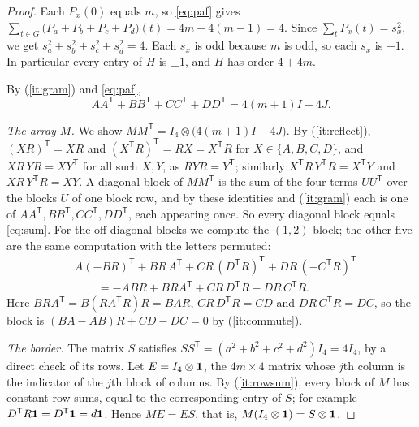 \documentclass[11pt,colorlinks]{charlie}
\newcommand{\T}{\mathsf T}
\begin{document}
\begin{proof}
Each $P_x(0)$ equals $m$, so \eqref{eq:paf} gives $\sum_{t\in G}\bigl(P_a+P_b+P_c+P_d\bigr)(t)=4m-4(m-1)=4$. Since $\sum_tP_x(t)=s_x^2$, we get $s_a^2+s_b^2+s_c^2+s_d^2=4$. Each $s_x$ is odd because $m$ is odd, so each $s_x$ is $\pm1$. In particular every entry of $H$ is $\pm1$, and $H$ has order $4+4m$.

By (\ref{it:gram}) and \eqref{eq:paf},
\begin{equation}\label{eq:sum}
AA^{\T}+BB^{\T}+CC^{\T}+DD^{\T}=4(m+1)I-4J.
\end{equation}

\emph{The array $M$.} We show $MM^{\T}=I_4\otimes\bigl(4(m+1)I-4J\bigr)$. By (\ref{it:reflect}), $(XR)^{\T}=XR$ and $(X^{\T}R)^{\T}=RX=X^{\T}R$ for $X\in\{A,B,C,D\}$, and $XR\,YR=XY^{\T}$ for all such $X,Y$, as $RYR=Y^{\T}$; similarly $X^{\T}R\,Y^{\T}R=X^{\T}Y$ and $XR\,Y^{\T}R=XY$. A diagonal block of $MM^{\T}$ is the sum of the four terms $UU^{\T}$ over the blocks $U$ of one block row, and by these identities and (\ref{it:gram}) each is one of $AA^{\T},BB^{\T},CC^{\T},DD^{\T}$, each appearing once. So every diagonal block equals \eqref{eq:sum}. For the off-diagonal blocks we compute the $(1,2)$ block; the other five are the same computation with the letters permuted:
\begin{align*}
&A(-BR)^{\T}+BR\,A^{\T}+CR\,(D^{\T}R)^{\T}+DR\,(-C^{\T}R)^{\T}\\
&\qquad=-ABR+BRA^{\T}+CR\,D^{\T}R-DR\,C^{\T}R .
\end{align*}
Here $BRA^{\T}=B(RA^{\T}R)R=BAR$, $CR\,D^{\T}R=CD$ and $DR\,C^{\T}R=DC$, so the block is $(BA-AB)R+CD-DC=0$ by (\ref{it:commute}).

\emph{The border.} The matrix $S$ satisfies $SS^{\T}=(a^2+b^2+c^2+d^2)I_4=4I_4$, by a direct check of its rows. Let $E=I_4\otimes\mathbf{1}$, the $4m\times4$ matrix whose $j$th column is the indicator of the $j$th block of columns. By (\ref{it:rowsum}), every block of $M$ has constant row sums, equal to the corresponding entry of $S$; for example $D^{\T}R\one=D^{\T}\one=d\one$. Hence $ME=ES$, that is, $M(I_4\otimes\mathbf{1})=S\otimes\mathbf{1}$.


\end{proof}
\end{document}
